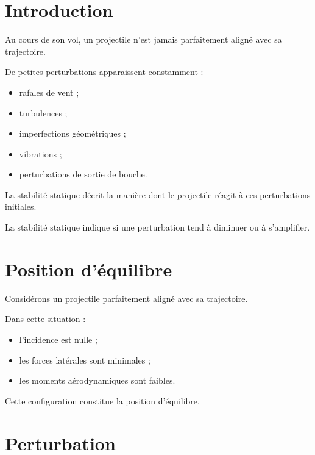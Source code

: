 
\section{Introduction}

Au cours de son vol, un projectile n'est jamais parfaitement aligné avec sa
trajectoire.

De petites perturbations apparaissent constamment :

\begin{itemize}
    \item rafales de vent ;
    \item turbulences ;
    \item imperfections géométriques ;
    \item vibrations ;
    \item perturbations de sortie de bouche.
\end{itemize}

La stabilité statique décrit la manière dont le projectile réagit à ces
perturbations initiales.

\begin{aretenir}

La stabilité statique indique si une perturbation tend à diminuer ou à
s'amplifier.

\end{aretenir}

\section{Position d'équilibre}

Considérons un projectile parfaitement aligné avec sa trajectoire.

Dans cette situation :

\begin{itemize}
    \item l'incidence est nulle ;
    \item les forces latérales sont minimales ;
    \item les moments aérodynamiques sont faibles.
\end{itemize}

Cette configuration constitue la position d'équilibre.

\section{Perturbation}

